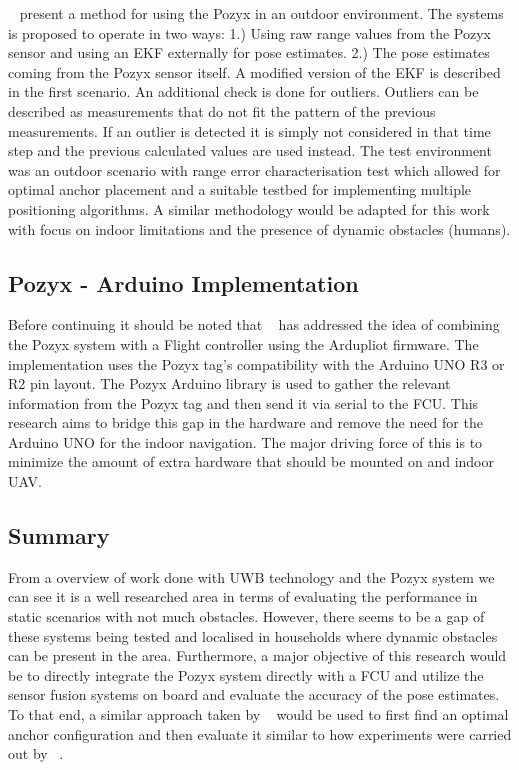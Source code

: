 ~\citet{conceiccao2017robot} present a method for using the Pozyx in an outdoor environment.
The systems is proposed to operate in two ways: 1.) Using raw range values from the Pozyx sensor and using an EKF externally for pose estimates. 2.) The pose estimates coming from the Pozyx sensor itself.
A modified version of the EKF is described in the first scenario.
An additional check is done for outliers.
Outliers can be described as measurements that do not fit the pattern of the previous measurements.
If an outlier is detected it is simply not considered in that time step and the previous calculated values are used instead.
The test environment was an outdoor scenario with range error characterisation test which allowed for optimal anchor placement and a suitable testbed for implementing multiple positioning algorithms.
A similar methodology would be adapted for this work with focus on indoor limitations and the presence of dynamic obstacles (humans).



\subsection{Pozyx - Arduino Implementation}
Before continuing it should be noted that ~\citet{ardupilotarduino} has addressed the idea of combining the Pozyx system with a Flight controller using the Ardupliot firmware.
The implementation uses the Pozyx tag's compatibility with the Arduino UNO R3 or R2 pin layout.
The Pozyx Arduino library is used to gather the relevant information from the Pozyx tag and then send it via serial to the FCU.
This research aims to bridge this gap in the hardware and remove the need for the Arduino UNO for the indoor navigation.
The major driving force of this is to minimize the amount of extra hardware that should be mounted on and indoor UAV.

\subsection{Summary}
From a overview of work done with UWB technology and the Pozyx system we can see it is a well researched area in terms of evaluating the performance in static scenarios with not much obstacles.
However, there seems to be a gap of these systems being tested and localised in households where dynamic obstacles can be present in the area.
Furthermore, a major objective of this research would be to directly integrate the Pozyx system directly with a FCU and utilize the sensor fusion systems on board and evaluate the accuracy of the pose estimates.
To that end, a similar approach taken by ~\citet{di2019evaluation} would be used to first find an optimal anchor configuration and then evaluate it similar to how experiments were carried out by ~\citet{conceiccao2017robot}.